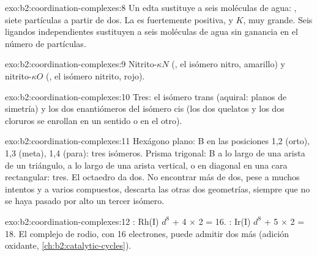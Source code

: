 \begin{solution}{exo:b2:coordination-complexes:8}
Un edta sustituye a seis moléculas de agua: , siete partículas a partir de dos. La  es fuertemente positiva, y
$K$, muy grande. Seis ligandos independientes sustituyen a seis moléculas de agua sin ganancia en el
número de partículas.
\end{solution}

\begin{solution}{exo:b2:coordination-complexes:9}
Nitrito-$\kappa N$ (, el isómero nitro, amarillo) y nitrito-$\kappa O$
(, el isómero nitrito, rojo).
\end{solution}

\begin{solution}{exo:b2:coordination-complexes:10}
Tres: el isómero trans (aquiral: planos de simetría) y los dos enantiómeros del isómero
cis (los dos quelatos y los dos cloruros se enrollan en un sentido o en el otro).
\end{solution}

\begin{solution}{exo:b2:coordination-complexes:11}
Hexágono plano: B en las posiciones 1,2 (orto), 1,3 (meta), 1,4 (para): tres isómeros.
Prisma trigonal: B a lo largo de una arista de un triángulo, a lo largo de una arista vertical, o en diagonal en una
cara rectangular: tres. El octaedro da dos. No encontrar más de dos, pese a
muchos intentos y a varios compuestos, descarta las otras dos geometrías, siempre que no se haya
pasado por alto un tercer isómero.
\end{solution}

\begin{solution}{exo:b2:coordination-complexes:12}
: Rh(I) $d^8$ + 4 × 2 = 16. : Ir(I) $d^8$ + 5 × 2 =
18. El complejo de rodio, con 16 electrones, puede admitir dos más (adición oxidante,
\cref{ch:b2:catalytic-cycles}).
\end{solution}


